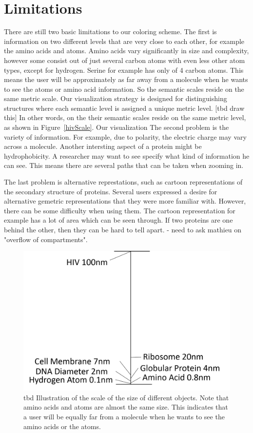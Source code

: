 \documentclass[review,journal]{vgtc}         %
\begin{document}
\section{Limitations}
There are still two basic limitations to our coloring scheme. 
The first is information on two different levels that are very close to each other, for example the amino acids and atoms. 
Amino acids vary significantly in size and complexity, however some consist out of just several carbon atoms with even less other atom types, except for hydrogen. 
Serine for example has only of 4 carbon atoms. This means the user will be approximately as far away from a molecule when he wants to see the atoms or amino acid information. 
So the semantic scales reside on the same metric scale.
Our visualization strategy is designed for distinguishing structures where each semantic level is assigned a unique metric level. [tbd draw this]
In other words, on the their semantic scales reside on the same metric level, as shown in Figure~\ref{hivScale}.
Our visualization 
The second problem is the variety of information. 
For example, due to polarity, the electric charge may vary across a molecule. 
Another intersting aspect of a protein might be hydrophobicity.
A researcher may want to see specify what kind of information he can see. 
This means there are several paths that can be taken when zooming in.

The last problem is alternative represtations, such as cartoon representations of the secondary structure of proteins. 
Several users expressed a desire for alternative gemetric representations that they were more familiar with.
However, there can be some difficulty when using them. The cartoon representation for example has a lot of area which can be seen through. 
If two proteins are one behind the other, then they can be hard to tell apart.
- need to ask mathieu on "overflow of compartments".

\begin{figure}
	\centering
	\includegraphics[width=1\linewidth]{Figures/hivscale}
	\caption{tbd Illustration of the scale of the size of different objects. Note that amino acids and atoms are almost the same size. This indicates that a user will be equally far from a molecule when he wants to see the amino acids or the atoms.}
	\label{fig:hivScale}
\end{figure}
\end{document}
